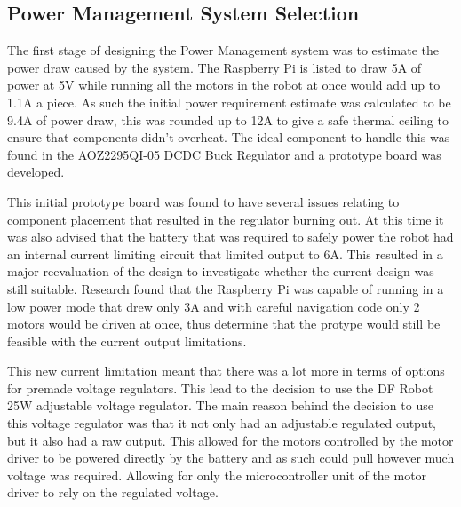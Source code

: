 \documentclass{article}
\begin{document}
\subsection{Power Management System Selection}
The first stage of designing the Power Management system was to estimate the power draw caused by the system. The Raspberry Pi is listed to draw 5A of power at 5V while
running all the motors in the robot at once would add up to 1.1A a piece. As such the initial power requirement estimate was calculated to be 9.4A of power draw, this
was rounded up to 12A to give a safe thermal ceiling to ensure that components didn't overheat. The ideal component to handle this was found in the AOZ2295QI-05 DCDC Buck
Regulator and a prototype board was developed.
\par
This initial prototype board was found to have several issues relating to component placement that resulted in the regulator burning out. At this time it was also advised
that the battery that was required to safely power the robot had an internal current limiting circuit that limited output to 6A. This resulted in a major reevaluation of
the design to investigate whether the current design was still suitable. Research found that the Raspberry Pi was capable of running in a low power mode that drew only 3A
and with careful navigation code only 2 motors would be driven at once, thus determine that the protype would still be feasible with the current output limitations.
\par
This new current limitation meant that there was a lot more in terms of options for premade voltage regulators. This lead to the decision to use the DF Robot 25W
adjustable voltage regulator. The main reason behind the decision to use this voltage regulator was that it not only had an adjustable regulated output, but it also had
a raw output. This allowed for the motors controlled by the motor driver to be powered directly by the battery and as such could pull however much voltage was required.
Allowing for only the microcontroller unit of the motor driver to rely on the regulated voltage.
\par
\end{document}
